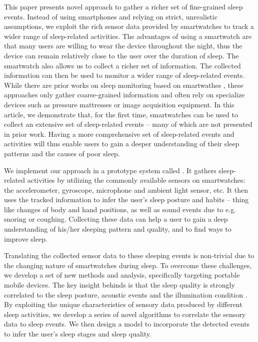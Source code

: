This paper presents novel approach to gather a richer set of fine-grained sleep events. Instead of using smartphones and relying on strict,
unrealistic assumptions, we exploit the rich sensor data provided by smartwatches to track a wider range of sleep-related activities. The
advantages of using a smartwatch are that many users are willing to wear the device throughout the night, thus the device can remain
relatively close to the user over the duration of sleep. The smartwatch also allows us to collect a richer set of information. The
collected information can then be used to monitor a wider range of sleep-related events. While there are prior works on sleep monitoring
based on smartwathes \cite{pombo2016ubisleep,shelgikar2016sleep,haescher2015anomaly,borazio2012combining}, these approaches only gather
coarse-grained information and often rely on specialize devices such as pressure mattresses or image acquisition equipment. In this
article, we demonstrate that, for the first time, smartwatches can be used to collect an extensive set of sleep-related events -- many of
which are not presented in prior work. Having a more comprehensive set of sleep-related events and activities will thus enable users to
gain a deeper understanding of their sleep patterns and the causes of poor sleep.

We implement our approach in a prototype system called \systemname. It gathers sleep-related activities by utilizing the commonly available
sensors on smartwatches: the accelerometer, gyroscope, microphone and ambient light sensor, etc. It then uses the tracked information to
infer the user's sleep posture and habits -- thing like changes of body and hand positions, as well as sound events due to e.g. snoring or
coughing.  Collecting these data can help a user to gain a deep understanding of his/her sleeping pattern and quality, and to find ways to
improve sleep. 

Translating the collected sensor data to these sleeping events is non-trivial due to the changing nature of smartwatches during sleep. To
overcome these challenges, we develop a set of new methods and analysis, specifically targeting portable mobile devices.  The key insight
behinds {\systemname} is that the sleep quality is strongly correlated to the sleep posture, acoustic events and the illumination condition
\cite{shelgikar2016sleep}. By exploiting the unique characteristics of sensory data produced by different sleep activities, we develop a
series of novel algorithms to correlate the sensory data to sleep events. We then design a model to incorporate the detected events to
infer the user's sleep stages and sleep quality. 

